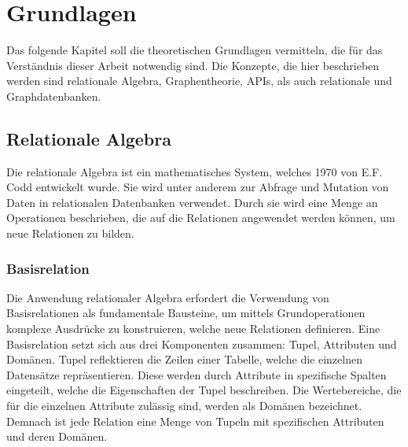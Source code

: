 \chapter{Grundlagen} %
\label{sec:grundlagen}
Das folgende Kapitel soll die theoretischen Grundlagen vermitteln, die für das Verständnis dieser Arbeit notwendig sind. Die Konzepte, die hier beschrieben werden sind relationale Algebra, Graphentheorie, APIs, als auch relationale und Graphdatenbanken.
\section{Relationale Algebra} %
\label{sec:relationaleAlgebra}
Die relationale Algebra ist ein mathematisches System, welches 1970 von E.F. Codd entwickelt wurde. Sie wird unter anderem zur Abfrage und Mutation von Daten in relationalen Datenbanken verwendet. Durch sie wird eine Menge an Operationen beschrieben, die auf die Relationen angewendet werden können, um neue Relationen zu bilden. \citep{relationalModel}

\subsection{Basisrelation} %
\label{sec:basisrelation}
Die Anwendung relationaler Algebra erfordert die Verwendung von Basisrelationen als fundamentale Bausteine, um mittels Grundoperationen komplexe Ausdrücke zu konstruieren, welche neue Relationen definieren. Eine Basisrelation setzt sich aus drei Komponenten zusammen: Tupel, Attributen und Domänen. Tupel reflektieren die Zeilen einer Tabelle, welche die einzelnen Datensätze repräsentieren. Diese werden durch Attribute in spezifische Spalten eingeteilt, welche die Eigenschaften der Tupel beschreiben. Die Wertebereiche, die für die einzelnen Attribute zulässig sind, werden als Domänen bezeichnet. Demnach ist jede Relation eine Menge von Tupeln mit spezifischen Attributen und deren Domänen. \citep{rdb}

